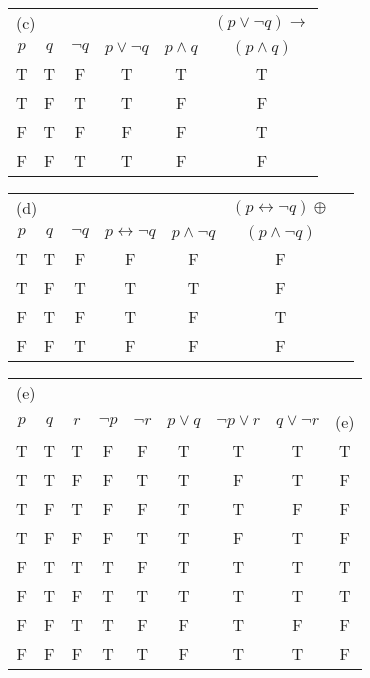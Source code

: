 \documentclass[12pt,addpoints]{exam}
\newcommand{\ra}{\rightarrow}
\newcommand{\lra}{\leftrightarrow}
\newcommand{\xor}{\oplus}
\begin{document}
\begin{questions}
\begin{solution}
        \smallskip
        \begin{tabular}{c|c|c||c|c|c}
            \multicolumn{5}{l}{ (c) } & $(p \vee \neg q) \ra $ \\
            $p$ & $q$ & $\neg q$ & $p \vee \neg q$ & $p \wedge q$ & $(p \wedge q)$ \\
         \hline
            T & T & F & T & T & T \\
            T & F & T & T & F & F \\
            F & T & F & F & F & T \\
            F & F & T & T & F & F \\
        \end{tabular} \hspace{0.5in}
        \begin{tabular}{c|c|c||c|c|c|c} %
            \multicolumn{5}{l}{(d)} & $(p \lra \neg q) \xor$ \\
            $p$ & $q$ & $\neg q$ & $p \lra \neg q$ & $p \wedge \neg q$ & $ (p \wedge \neg q)$ \\
         \hline
            T & T & F & F & F  & F \\
            T & F & T & T & T  & F \\
            F & T & F & T & F  & T \\
            F & F & T & F & F  & F \\
        \end{tabular}

        \smallskip
        \begin{tabular}{c|c|c|c|c||c|c|c|c}
            \multicolumn{4}{l}{(e)} & \\
            $p$ & $q$ & $r$ & $\neg p$ & $\neg r$ & $p \vee q$ & $\neg p \vee r$ & $q \vee \neg r$ & (e) \\
         \hline
            T & T & T & F & F & T & T & T & T \\
            T & T & F & F & T & T & F & T & F \\
            T & F & T & F & F & T & T & F & F \\
            T & F & F & F & T & T & F & T & F \\
          \hline
            F & T & T & T & F & T & T & T & T \\
            F & T & F & T & T & T & T & T & T \\
            F & F & T & T & F & F & T & F & F \\
            F & F & F & T & T & F & T & T & F
         \end{tabular} \hspace{0.4in}
    \end{solution}



\end{questions}
\end{document}
